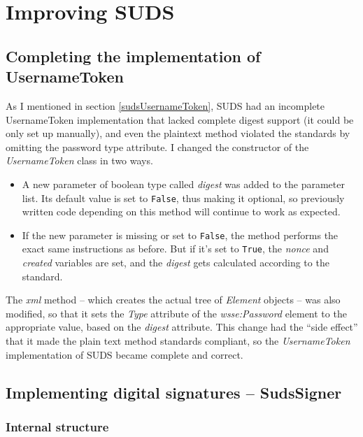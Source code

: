 \chapter{Improving SUDS}

\section{Completing the implementation of UsernameToken}

As I mentioned in section \ref{sudsUsernameToken}, SUDS had an incomplete UsernameToken implementation that lacked complete digest support (it could be only set up manually), and even the plaintext method violated the standards by omitting the password type attribute. I changed the constructor of the \emph{UsernameToken} class in two ways.

\begin{itemize}
 \item A new parameter of boolean type called \emph{digest} was added to the parameter list. Its default value is set to \verb|False|, thus making it optional, so previously written code depending on this method will continue to work as expected.
 \item If the new parameter is missing or set to \verb|False|, the method performs the exact same instructions as before. But if it's set to \verb|True|, the \emph{nonce} and \emph{created} variables are set, and the \emph{digest} gets calculated according to the standard.
\end{itemize}

The \emph{xml} method -- which creates the actual tree of \emph{Element} objects -- was also modified, so that it sets the \emph{Type} attribute of the \emph{wsse:Password} element to the appropriate value, based on the \emph{digest} attribute. This change had the ``side effect'' that it made the plain text method standards compliant, so the \emph{UsernameToken} implementation of SUDS became complete and correct.

\section{Implementing digital signatures -- SudsSigner}

\subsection{Internal structure}


